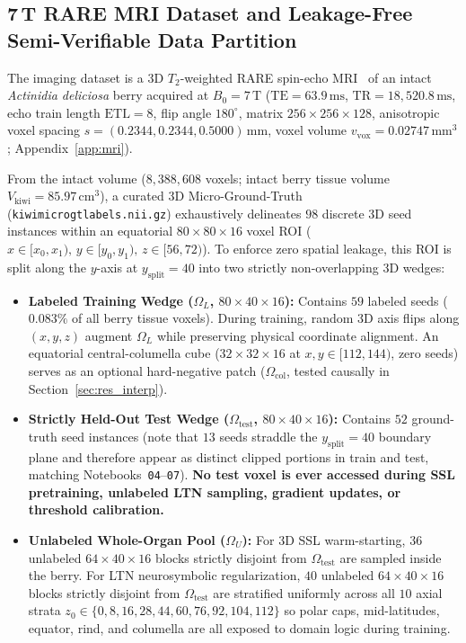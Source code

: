 \documentclass[10pt,a4paper]{article}
\renewcommand{\_}{\origunderscore\allowbreak}
\begin{document}
\subsection{7\,T RARE MRI Dataset and Leakage-Free Semi-Verifiable Data Partition}

The imaging dataset is a 3D $T_2$-weighted RARE spin-echo MRI~\cite{hennig1986rare} of an intact \textit{Actinidia deliciosa} berry acquired at $B_0 = 7\,\text{T}$ ($\text{TE} = 63.9\,\text{ms}$, $\text{TR} = 18{,}520.8\,\text{ms}$, echo train length $\text{ETL} = 8$, flip angle $180^\circ$, matrix $256 \times 256 \times 128$, anisotropic voxel spacing $s = (0.2344, 0.2344, 0.5000)\,\text{mm}$, voxel volume $v_{\text{vox}} = 0.02747\,\text{mm}^3$; Appendix~\ref{app:mri}).

From the intact volume ($8{,}388{,}608$ voxels; intact berry tissue volume $V_{\text{kiwi}} = 85.97\,\text{cm}^3$), a curated 3D Micro-Ground-Truth (\texttt{kiwi\_micro\_gt\_labels.nii.gz}) exhaustively delineates $98$ discrete 3D seed instances within an equatorial $80 \times 80 \times 16$ voxel ROI ($x \in [x_0, x_1),\, y \in [y_0, y_1),\, z \in [56, 72)$). To enforce zero spatial leakage, this ROI is split along the $y$-axis at $y_{\text{split}} = 40$ into two strictly non-overlapping 3D wedges:
\begin{itemize}
    \item \textbf{Labeled Training Wedge ($\Omega_L$, $80 \times 40 \times 16$):} Contains $59$ labeled seeds ($0.083\%$ of all berry tissue voxels). During training, random 3D axis flips along $(x, y, z)$ augment $\Omega_L$ while preserving physical coordinate alignment. An equatorial central-columella cube ($32 \times 32 \times 16$ at $x, y \in [112, 144)$, zero seeds) serves as an optional hard-negative patch ($\Omega_{\text{col}}$, tested causally in Section~\ref{sec:res_interp}).
    \item \textbf{Strictly Held-Out Test Wedge ($\Omega_{\text{test}}$, $80 \times 40 \times 16$):} Contains $52$ ground-truth seed instances (note that $13$ seeds straddle the $y_{\text{split}} = 40$ boundary plane and therefore appear as distinct clipped portions in train and test, matching Notebooks~\texttt{04}--\texttt{07}). \textbf{No test voxel is ever accessed during SSL pretraining, unlabeled LTN sampling, gradient updates, or threshold calibration.}
    \item \textbf{Unlabeled Whole-Organ Pool ($\Omega_U$):} For 3D SSL warm-starting, $36$ unlabeled $64 \times 40 \times 16$ blocks strictly disjoint from $\Omega_{\text{test}}$ are sampled inside the berry. For LTN neurosymbolic regularization, $40$ unlabeled $64 \times 40 \times 16$ blocks strictly disjoint from $\Omega_{\text{test}}$ are stratified uniformly across all $10$ axial strata $z_0 \in \{0, 8, 16, 28, 44, 60, 76, 92, 104, 112\}$ so polar caps, mid-latitudes, equator, rind, and columella are all exposed to domain logic during training.
\end{itemize}
\end{document}

